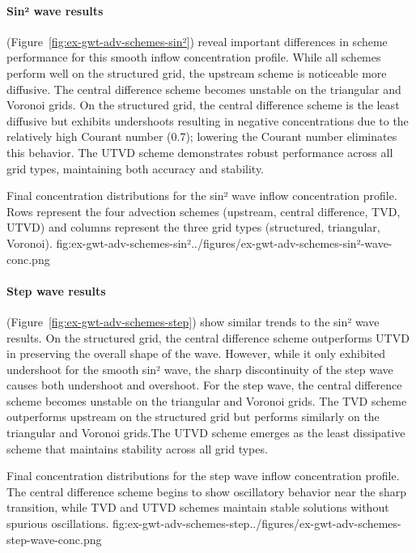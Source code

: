 \paragraph{Sin² wave results} (Figure~\ref{fig:ex-gwt-adv-schemes-sin²}) reveal important differences in scheme performance for this smooth inflow concentration profile. While all schemes perform well on the structured grid, the upstream scheme is noticeable more diffusive. The central difference scheme becomes unstable on the triangular and Voronoi grids. On the structured grid, the central difference scheme is the least diffusive but exhibits undershoots resulting in negative concentrations due to the relatively high Courant number (0.7); lowering the Courant number eliminates this behavior. The UTVD scheme demonstrates robust performance across all grid types, maintaining both accuracy and stability.
\begin{StandardFigure}{
    Final concentration distributions for the sin² wave inflow concentration profile. Rows represent the four advection schemes (upstream, central difference, TVD, UTVD) and columns represent the three grid types (structured, triangular, Voronoi).
}{fig:ex-gwt-adv-schemes-sin²}{../figures/ex-gwt-adv-schemes-sin²-wave-conc.png}
\end{StandardFigure}

\paragraph{Step wave results} (Figure~\ref{fig:ex-gwt-adv-schemes-step}) show similar trends to the sin² wave results. On the structured grid, the central difference scheme outperforms UTVD in preserving the overall shape of the wave. However, while it only exhibited undershoot for the smooth sin² wave, the sharp discontinuity of the step wave causes both undershoot and overshoot. For the step wave, the central difference scheme becomes unstable on the triangular and Voronoi grids. The TVD scheme outperforms upstream on the structured grid but performs similarly on the triangular and Voronoi grids.The UTVD scheme emerges as the least dissipative scheme that maintains stability across all grid types.
\begin{StandardFigure}{
    Final concentration distributions for the step wave inflow concentration profile. The central difference scheme begins to show oscillatory behavior near the sharp transition, while TVD and UTVD schemes maintain stable solutions without spurious oscillations.
}{fig:ex-gwt-adv-schemes-step}{../figures/ex-gwt-adv-schemes-step-wave-conc.png}
\end{StandardFigure}

